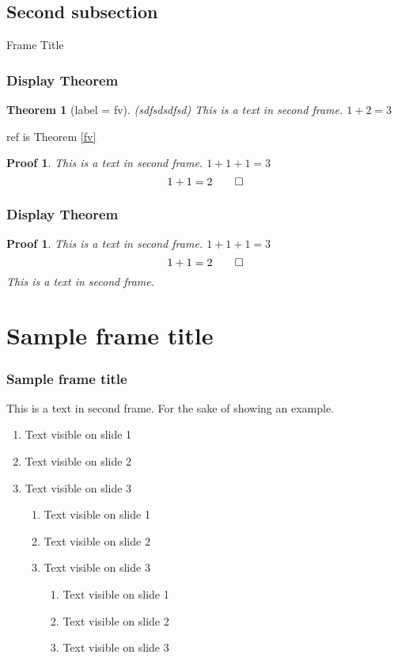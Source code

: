 \documentclass[10pt]{beamer}
\newtheorem{myproofcut}{Proof}[section]
\newtheorem{myproof}{Proof}[section]
\newtheorem{mythm}{Theorem}[section]
\begin{document}
\subsection{Second subsection}

\begin{frame}{Frame Title}
    \subsectionpage
\end{frame}

\begin{frame}
  \frametitle{Display Theorem}
  \begin{mythm}[label = fv]{(sdfsdsdfsd)}
    This is a text in second frame. $1 + 2 = 3$
  \end{mythm}
    ref is Theorem \ref{fv}
  
  \begin{myproof}{}
    This is a text in second frame. $1 + 1 + 1 = 3$
    \begin{displaymath}
    1 + 1 = 2\qedhere
    \end{displaymath}
  \end{myproof}
\end{frame}

\begin{frame}
  \frametitle{Display Theorem}
  \begin{myproofcut}{}
    This is a text in second frame. $1 + 1 + 1 = 3$
    \begin{displaymath}
    1 + 1 = 2\qedhere
    \end{displaymath}
  \tcblower
    This is a text in second frame. 
  \end{myproofcut}
\end{frame}

\section{Sample frame title}


\begin{frame}
\frametitle{Sample frame title}
This is a text in second frame.
For the sake of showing an example.

\begin{enumerate}
 \itemsep0em
 \item Text visible on slide 1
 \item Text visible on slide 2
 \item Text visible on slide 3
 \begin{enumerate}
 \itemsep0em
 \item Text visible on slide 1
 \item Text visible on slide 2
 \item Text visible on slide 3
 \begin{enumerate}
 \itemsep0em
 \item Text visible on slide 1
 \item Text visible on slide 2
 \item Text visible on slide 3
\end{enumerate}
\end{enumerate}
\end{enumerate}
\end{frame}
\end{document}
